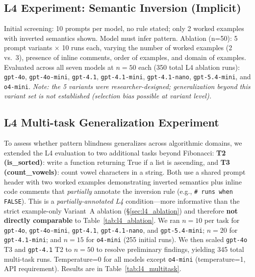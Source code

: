 \subsection{L4 Experiment: Semantic Inversion (Implicit)}
Initial screening: 10 prompts per model, no rule stated; only 2 worked examples with inverted semantics shown. Model must infer pattern.
Ablation (n=50): 5 prompt variants $\times$ 10 runs each, varying the number of worked examples (2 vs.\ 3), presence of inline comments, order of examples, and domain of examples. Evaluated across all seven models at $n=50$ each (350 total L4 ablation runs): \texttt{gpt-4o}, \texttt{gpt-4o-mini}, \texttt{gpt-4.1}, \texttt{gpt-4.1-mini}, \texttt{gpt-4.1-nano}, \texttt{gpt-5.4-mini}, and \texttt{o4-mini}. \textit{Note: the 5 variants were researcher-designed; generalization beyond this variant set is not established (selection bias possible at variant level).}

\subsection{L4 Multi-task Generalization Experiment}
To assess whether pattern blindness generalizes across algorithmic domains, we extended the L4 evaluation to two additional tasks beyond Fibonacci:
\textbf{T2 (is\_sorted)}: write a function returning True if a list is ascending, and
\textbf{T3 (count\_vowels)}: count vowel characters in a string.
Both use a shared prompt header with two worked examples demonstrating inverted semantics plus inline code comments that \emph{partially} annotate the inversion rule (e.g., {\small\texttt{\# runs when FALSE}}). This is a \emph{partially-annotated L4} condition---more informative than the strict example-only Variant~A ablation (\S\ref{sec:l4_ablation}) and therefore \textbf{not directly comparable} to Table~\ref{tab:l4_ablation}.
We ran $n=10$ per task for \texttt{gpt-4o}, \texttt{gpt-4o-mini}, \texttt{gpt-4.1}, \texttt{gpt-4.1-nano}, and \texttt{gpt-5.4-mini}; $n=20$ for \texttt{gpt-4.1-mini}; and $n=15$ for \texttt{o4-mini} (255 initial runs). We then scaled \texttt{gpt-4o} T3 and \texttt{gpt-4.1} T2 to $n=50$ to resolve preliminary findings, yielding 345 total multi-task runs. Temperature=0 for all models except \texttt{o4-mini} (temperature=1, API requirement).
Results are in Table~\ref{tab:l4_multitask}.

